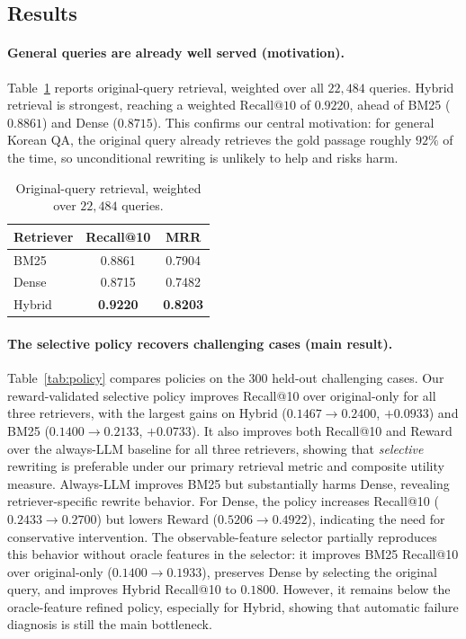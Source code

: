 \documentclass{article}
\begin{document}
\subsection{Results}
\label{sec:results}

\paragraph{General queries are already well served (motivation).}
Table~\ref{tab:baseline} reports original-query retrieval, weighted over all
$22{,}484$ queries. Hybrid retrieval is strongest, reaching a weighted
$\mathrm{Recall@10}$ of $0.9220$, ahead of BM25 ($0.8861$) and Dense ($0.8715$).
This confirms our central motivation: for general Korean QA, the original query
already retrieves the gold passage roughly $92\%$ of the time, so unconditional
rewriting is unlikely to help and risks harm.

\begin{table}[ht]
\centering
\caption{Original-query retrieval, weighted over $22{,}484$ queries.}
\label{tab:baseline}
\begin{tabular}{lcc}
\toprule
Retriever & Recall@10 & MRR \\
\midrule
BM25   & 0.8861 & 0.7904 \\
Dense  & 0.8715 & 0.7482 \\
Hybrid & \textbf{0.9220} & \textbf{0.8203} \\
\bottomrule
\end{tabular}
\end{table}


\paragraph{The selective policy recovers challenging cases (main result).}
Table~\ref{tab:policy} compares policies on the $300$ held-out challenging cases. Our
reward-validated selective policy improves Recall@10 over original-only for all
three retrievers, with the largest gains on Hybrid ($0.1467 \to 0.2400$,
$+0.0933$) and BM25 ($0.1400 \to 0.2133$, $+0.0733$). It also improves both
Recall@10 and Reward over the always-LLM baseline for all three retrievers,
showing that \emph{selective} rewriting is preferable under our primary
retrieval metric and composite utility measure. Always-LLM improves BM25 but
substantially harms Dense, revealing retriever-specific rewrite behavior. For
Dense, the policy increases Recall@10 ($0.2433 \to 0.2700$) but lowers Reward
($0.5206 \to 0.4922$), indicating the need for conservative intervention.
The observable-feature selector partially reproduces this behavior without
oracle features in the selector: it improves BM25 Recall@10 over original-only
($0.1400 \to 0.1933$), preserves Dense by selecting the original query, and
improves Hybrid Recall@10 to $0.1800$. However, it remains below the
oracle-feature refined policy, especially for Hybrid, showing that automatic
failure diagnosis is still the main bottleneck.
\end{document}
